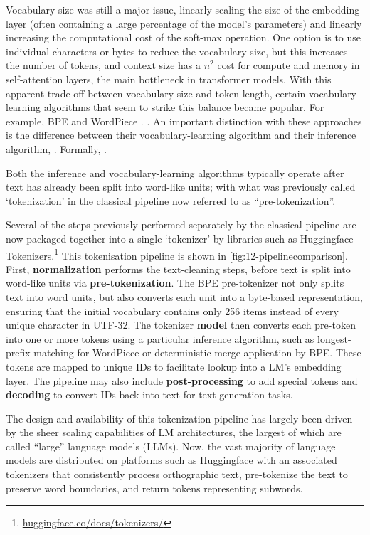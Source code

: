 Vocabulary size was still a major issue, linearly scaling the size of the embedding layer (often containing a large percentage of the model's parameters) and linearly increasing the computational cost of the soft-max operation. One option is to use individual characters or bytes to reduce the vocabulary size, but this increases the number of tokens, and context size has a $n^2$ cost for compute and memory in self-attention layers, the main bottleneck in transformer models. With this apparent trade-off between vocabulary size and token length, certain vocabulary-learning algorithms that seem to strike this balance became popular. For example, BPE and WordPiece \addcites. \writemore. An important distinction with these approaches is the difference between their vocabulary-learning algorithm and their inference algorithm, \writemore. Formally, \writemore. 

Both the inference and vocabulary-learning algorithms typically operate after text has already been split into word-like units; with what was previously called `tokenization' in the classical pipeline now referred to as ``pre-tokenization''. 

Several of the steps previously performed separately by the classical pipeline are now packaged together into a single `tokenizer' by libraries such as Huggingface Tokenizers.\footnote{\href{https://huggingface.co/docs/tokenizers/index}{huggingface.co/docs/tokenizers/}} This tokenisation pipeline is shown in \cref{fig:12-pipelinecomparison}. First, \textbf{normalization} performs the text-cleaning steps, before text is split into word-like units via \textbf{pre-tokenization}. The BPE pre-tokenizer not only splits text into word units, but also converts each unit into a byte-based representation, ensuring that the initial vocabulary contains only 256 items instead of every unique character in UTF-32. The tokenizer \textbf{model} then converts each pre-token into one or more tokens using a particular inference algorithm, such as longest-prefix matching for WordPiece or deterministic-merge application by BPE. These tokens are mapped to unique IDs to facilitate lookup into a LM's embedding layer. The pipeline may also include \textbf{post-processing} to add special tokens and \textbf{decoding} to convert IDs back into text for text generation tasks. 

The design and availability of this tokenization pipeline has largely been driven by the sheer scaling capabilities of LM architectures, the largest of which are called ``large'' language models (LLMs). Now, the vast majority of language models are distributed on platforms such as Huggingface with an associated tokenizers that consistently process orthographic text, pre-tokenize the text to preserve word boundaries, and return tokens representing subwords.

